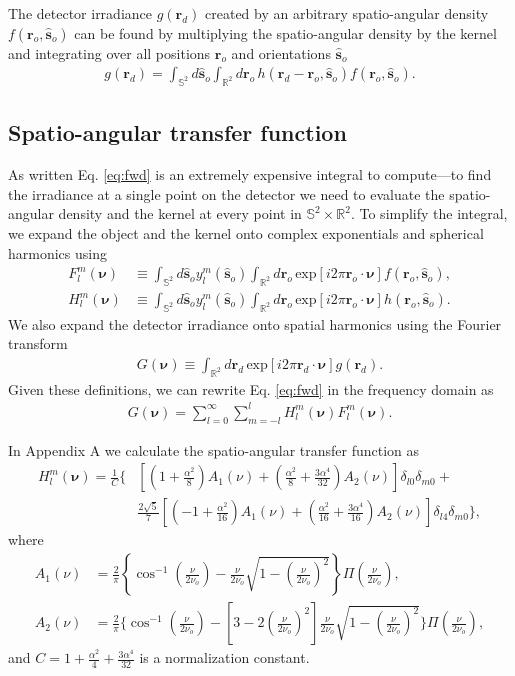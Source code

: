 \documentclass{osa-article}
\providecommand{\ro}[1]{\mathbf{\mathbf{r}}_o}
\providecommand{\so}[1]{\mathbf{\hat{s}}_o}
\providecommand{\rd}[1]{\mathbf{r}_d}
\providecommand{\mbb}[1]{\mathbb{#1}}
\providecommand{\bs}[1]{\boldsymbol{#1}}
\begin{document}
The detector irradiance $g(\rd{})$ created by an arbitrary spatio-angular
density $f(\ro{}, \so{})$ can be found by multiplying the spatio-angular density
by the kernel and integrating over all positions $\ro{}$ and orientations
$\so{}$
\begin{align}
g(\rd{}) = \int_{\mbb{S}^2}d\so{}\int_{\mbb{R}^2}d\ro{}\, h(\rd{} -\ro{}, \so{})f(\ro{}, \so{}). \label{eq:fwd}
\end{align}

\subsection{Spatio-angular transfer function}
As written Eq. \ref{eq:fwd} is an extremely expensive integral to compute---to
find the irradiance at a single point on the detector we need to evaluate the
spatio-angular density and the kernel at every point in
$\mbb{S}^2\times \mbb{R}^2$. To simplify the integral, we expand the object and
the kernel onto complex exponentials and spherical harmonics using
\begin{align}
  F_l^m(\bs{\nu}) &\equiv \int_{\mbb{S}^2}d\so{}y_l^m(\so{})\int_{\mbb{R}^2}d\ro{}\,\text{exp}\left[i2\pi \ro{}\cdot\bs{\nu}\right]f(\ro{}, \so{}),\\
  H_l^m(\bs{\nu}) &\equiv \int_{\mbb{S}^2}d\so{}y_l^m(\so{})\int_{\mbb{R}^2}d\ro{}\,\text{exp}\left[i2\pi \ro{}\cdot\bs{\nu}\right]h(\ro{}, \so{}).
\end{align}
We also expand the detector irradiance onto spatial harmonics using the Fourier
transform
\begin{align}
  G(\bs{\nu}) \equiv \int_{\mbb{R}^2}d\rd{}\,\text{exp}\left[i2\pi \rd{}\cdot\bs{\nu}\right]g(\rd{}).
\end{align}
Given these definitions, we can rewrite Eq. \ref{eq:fwd} in the frequency domain as 
\begin{align}
G(\bs{\nu}) = \sum_{l=0}^{\infty}\sum_{m=-l}^{l}H_l^m(\bs{\nu})F_l^m(\bs{\nu}). 
\end{align}

In Appendix A we calculate the spatio-angular transfer function as
\begin{align}
  H_l^m(\bs{\nu}) = \frac{1}{C}\Bigg\{&\left[\left(1 + \frac{\alpha^2}{8}\right)A_1(\nu) + \left(\frac{\alpha^2}{8} + \frac{3\alpha^4}{32}\right)A_2(\nu)\right]\delta_{l0}\delta_{m0}+\nonumber\\&\frac{2\sqrt{5}}{7}\left[\left(-1 + \frac{\alpha^2}{16}\right)A_1(\nu) + \left(\frac{\alpha^2}{16} + \frac{3\alpha^4}{16}\right)A_2(\nu)\right]\delta_{l4}\delta_{m0}\Bigg\}, 
\end{align}
where
\begin{align}
  A_1(\nu) &= \frac{2}{\pi}\left\{\cos^{-1}\left(\frac{\nu}{2\nu_o}\right) - \frac{\nu}{2\nu_o}\sqrt{1 - \left(\frac{\nu}{2\nu_o}\right)^2}\right\}\Pi\left(\frac{\nu}{2\nu_o}\right), \\
  A_2(\nu) &= \frac{2}{\pi}\Bigg\{\cos^{-1}\left(\frac{\nu}{2\nu_o}\right) - \left[3 - 2\left(\frac{\nu}{2\nu_o}\right)^2\right]\frac{\nu}{2\nu_o}\sqrt{1 - \left(\frac{\nu}{2\nu_o}\right)^2}\Bigg\}\Pi\left(\frac{\nu}{2\nu_o}\right), 
\end{align}
and $C = 1 + \frac{\alpha^2}{4} + \frac{3\alpha^4}{32}$ is a normalization
constant.
\end{document}
